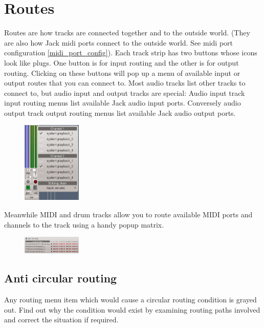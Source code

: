 \documentclass[a4paper]{report}
\begin{document}
\section{Routes} \label{routes}
Routes are how tracks are connected together and to the outside world.
(They are also how Jack midi ports connect to the outside world. See
midi port configuration \ref{midi_port_config}).
Each track strip has two buttons whose icons look like plugs. One button
is for input routing and the other is for output routing. Clicking on
these buttons will pop up a menu of available input or output routes that
you can connect to. Most audio tracks list other tracks to connect to, 
but audio input and output tracks are special: Audio input track input
routing menus list available Jack audio input ports. Conversely audio
output track output routing menus list available Jack audio output ports.

\begin{figure}
\includegraphics[width=0.25\textwidth]{pics/output_routing} 
\end{figure}

Meanwhile MIDI and drum tracks allow you to route available MIDI ports
and channels to the track using a handy popup matrix.

\begin{figure}
\includegraphics[width=0.25\textwidth]{pics/midi_routing_matrix} 
\end{figure}


\subsection{Anti circular routing} \label{anti_circular_routing}
Any routing menu item which would cause a circular routing condition
is grayed out. Find out why the condition would exist by examining 
routing paths involved and correct the situation if required.
\end{document}

